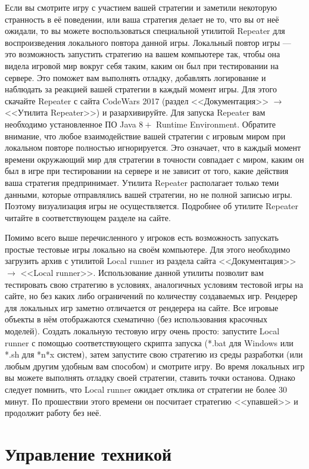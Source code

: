 Если вы смотрите игру с участием вашей стратегии и заметили некоторую странность в её поведении, или ваша стратегия делает не то, что вы от
неё ожидали, то вы можете воспользоваться специальной утилитой Repeater для воспроизведения локального повтора данной игры. Локальный повтор
игры --- это возможность запустить стратегию на вашем компьютере так, чтобы она видела игровой мир вокруг себя таким, каким он был при
тестировании на сервере. Это поможет вам выполнять отладку, добавлять логирование и наблюдать за реакцией вашей стратегии в каждый момент
игры. Для этого скачайте Repeater с сайта CodeWars 2017 (раздел <<Документация>> $\rightarrow$ <<Утилита Repeater>>) и разархивируйте.
Для запуска Repeater вам необходимо установленное ПО Java $8+$ Runtime Environment. Обратите внимание, что любое взаимодействие вашей
стратегии с игровым миром при локальном повторе полностью игнорируется. Это означает, что в каждый момент времени окружающий мир для
стратегии в точности совпадает с миром, каким он был в игре при тестировании на сервере и не зависит от того, какие действия ваша стратегия
предпринимает. Утилита Repeater располагает только теми данными, которые отправлялись вашей стратегии, но не полной записью игры. Поэтому
визуализация игры не осуществляется. Подробнее об утилите Repeater читайте в соответствующем разделе на сайте.

Помимо всего выше перечисленного у игроков есть возможность запускать простые тестовые игры локально на своём компьютере. Для этого
необходимо загрузить архив с утилитой Local runner из раздела сайта <<Документация>> $\rightarrow$ <<Local runner>>. Использование данной
утилиты позволит вам тестировать свою стратегию в условиях, аналогичных условиям тестовой игры на сайте, но без каких либо ограничений по
количеству создаваемых игр. Рендерер для локальных игр заметно отличается от рендерера на сайте. Все игровые объекты в нём отображаются
схематично (без использования красочных моделей). Создать локальную тестовую игру очень просто: запустите Local runner с помощью
соответствующего скрипта запуска (*.bat для Windows или *.sh для *n*x систем), затем запустите свою стратегию из среды разработки (или любым
другим удобным вам способом) и смотрите игру. Во время локальных игр вы можете выполнять отладку своей стратегии, ставить точки останова.
Однако следует помнить, что Local runner ожидает отклика от стратегии не более $30$ минут. По прошествии этого времени он посчитает
стратегию <<упавшей>> и продолжит работу без неё.

\section{Управление техникой}

